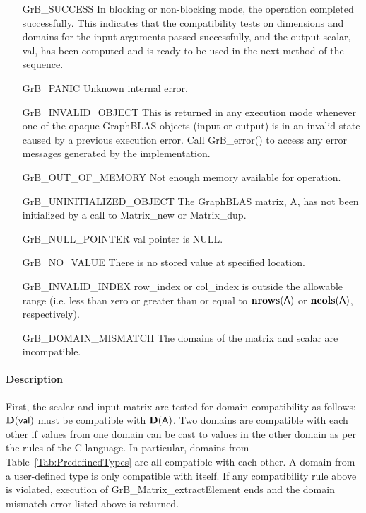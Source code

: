 \begin{itemize}[leftmargin=2.1in]
    \item[{\sf GrB\_SUCCESS}]  In blocking or non-blocking mode, the operation 
    completed successfully. This indicates that the compatibility tests on 
    dimensions and domains for the input arguments passed successfully, and
    the output scalar, {\sf val}, has been computed and is ready to be used in 
    the next method of the sequence.

    \item[{\sf GrB\_PANIC}]   Unknown internal error.
    
    \item[{\sf GrB\_INVALID\_OBJECT}] This is returned in any execution mode 
    whenever one of the opaque GraphBLAS objects (input or output) is in an invalid 
    state caused by a previous execution error.  Call {\sf GrB\_error()} to access 
    any error messages generated by the implementation.

    \item[{\sf GrB\_OUT\_OF\_MEMORY}]  Not enough memory available for operation.
    
    \item[{\sf GrB\_UNINITIALIZED\_OBJECT}]  The GraphBLAS matrix, {\sf A}, has 
    not been initialized by a call to {\sf Matrix\_new} or {\sf Matrix\_dup}.
    
    \item[{\sf GrB\_NULL\_POINTER}]    {\sf val} pointer is {\sf NULL}.

    \item[{\sf GrB\_NO\_VALUE}]  There is no stored value at specified location.
    
    \item[{\sf GrB\_INVALID\_INDEX}]  {\sf row\_index} or {\sf col\_index} is 
    outside the allowable range (i.e. less than zero or greater than or equal to  $\mathbf{nrows}({\sf A})$ or
    $\mathbf{ncols}({\sf A})$, respectively).

    \item[{\sf GrB\_DOMAIN\_MISMATCH}]     The domains of the matrix and scalar
    are incompatible.
\end{itemize}

\paragraph{Description}

First, the scalar and input matrix are tested for domain compatibility as follows:  
$\mathbf{D}({\sf val})$ must be compatible with $\mathbf{D}({\sf A})$. Two domains 
are compatible with each other if values from one domain can be cast to values 
in the other domain as per the rules of the C language.  In particular, domains 
from Table~\ref{Tab:PredefinedTypes} are all compatible with each other. A domain 
from a user-defined type is only compatible with itself.  If any compatibility 
rule above is violated, execution of {\sf GrB\_Matrix\_extractElement} ends and
the domain mismatch error listed above is returned.

